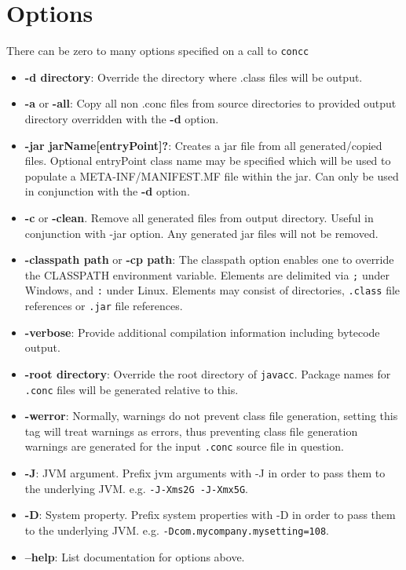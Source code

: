 \documentclass[conc-doc]{subfiles}
\begin{document}
\section{Options}
There can be zero to many options specified on a call to \lstinline[language=None]{concc}
\begin{itemize}
	\item \textbf{-d directory}: Override the directory where .class files will be output.
	\item \textbf{-a} or \textbf{-all}: Copy all non .conc files from source directories to provided output directory overridden with the \textbf{-d} option.
	\item \textbf{-jar jarName[entryPoint]?}: Creates a jar file from all generated/copied files. Optional entryPoint class name may be specified which will be used to populate a META-INF/MANIFEST.MF file within the jar. Can only be used in conjunction with the \textbf{-d} option.
	\item \textbf{-c} or \textbf{-clean}. Remove all generated files from output directory. Useful in conjunction with -jar option. Any generated jar files will not be removed.	
	\item \textbf{-classpath path} or \textbf{-cp path}: The classpath option enables one to override the CLASSPATH environment variable. Elements are delimited via \lstinline[language=None]{;} under Windows, and \lstinline[language=None]{:} under Linux. Elements may consist of directories, \lstinline[language=None]{.class} file references or \lstinline[language=None]{.jar} file references.
	\item \textbf{-verbose}: Provide additional compilation information including bytecode output.
	\item \textbf{-root directory}: Override the root directory of \lstinline[language=None]{javacc}. Package names for \lstinline[language=None]{.conc} files will be generated relative to this.
	\item \textbf{-werror}: Normally, warnings do not prevent class file generation, setting this tag will treat warnings as errors, thus preventing class file generation warnings are generated for the input \lstinline[language=None]{.conc} source file in question.
	\item \textbf{-J}: JVM argument. Prefix jvm arguments with -J in order to pass them to the underlying JVM. e.g. \lstinline[language=None]{-J-Xms2G -J-Xmx5G}.
	\item \textbf{-D}: System property. Prefix system properties with -D in order to pass them to the underlying JVM. e.g. \lstinline[language=None]{-Dcom.mycompany.mysetting=108}.
	\item \textbf{--help}: List documentation for options above.
\end{itemize}
\end{document}
